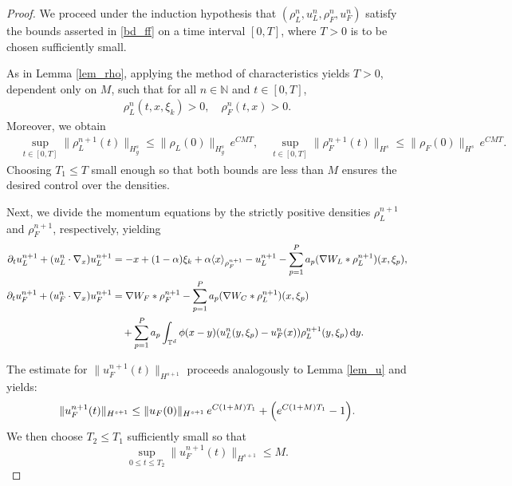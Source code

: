\documentclass[10pt, reqno]{amsart}
\theoremstyle{definition}
\theoremstyle{remark}
\numberwithin{equation}{section}
\newcommand{\dy}{\textnormal{d}y}
\newcommand{\T}{\mathbb{T}}
\newcommand{\p}{\partial}
\begin{document}
\begin{proof}
We proceed under the induction hypothesis that $(\rho_L^n, u_L^n, \rho_F^n, u_F^n)$ satisfy the bounds asserted in \eqref{bd_ff} on a time interval $[0, T]$, where $T > 0$ is to be chosen sufficiently small.

As in Lemma \ref{lem_rho}, applying the method of characteristics yields $T > 0$, dependent only on $M$, such that for all $n \in \mathbb{N}$ and $t \in [0, T]$,
    \begin{align*}
       \rho_L^{n}(t,x,\xi_k) > 0, \quad \rho_F^n (t,x) > 0.
    \end{align*}
    Moreover, we obtain 
\begin{align*}
    &\sup_{t\in [0,T]}  \|\rho_L^{n+1}(t)\|_{H^s_g} \le \|\rho_L(0)\|_{H^s_g}\, e^{CMT}, \quad \sup_{t\in [0,T]} \|\rho_F^{n+1}(t)\|_{H^s} \le \|\rho_F(0)\|_{H^s}\, e^{CMT}.
\end{align*}
Choosing $T_1 \leq T$ small enough so that both bounds are less than $M$ ensures the desired control over the densities.
 
Next, we divide the momentum equations by the strictly positive densities $\rho_L^{n+1}$ and $\rho_F^{n+1}$, respectively, yielding
    \begin{equation*}%
    \begin{split}
        \p_t u_L^{n+1} + (u_L^n\cdot \nabla_x) u_L^{n+1} &= -x + (1-\alpha) \xi_k + \alpha \langle x \rangle_{\rho_F^{n+1}}  - u_L^{n+1} - \sum_{p=1}^P a_p (\nabla W_L * \rho_L^{n+1})(x,\xi_p),\\
        \p_t u_F^{n+1} + (u_F^n\cdot \nabla_x)u_F^{n+1} &= \nabla W_F * \rho_F^{n+1} - \sum_{p=1}^P a_p (\nabla W_C * \rho_L^{n+1})(x,\xi_p) \\
        &\quad + \sum_{p=1}^P a_p \int_{\T^d} \phi(x-y) (u_L^n(y,\xi_p) - u_F^n(x)) \rho_L^{n+1}(y,\xi_p)\,\dy.
    \end{split}
    \end{equation*}
    
The estimate for $\|u_F^{n+1}(t)\|_{H^{s+1}}$ proceeds analogously to Lemma \ref{lem_u} and yields:
\[
\|u_F^{n+1}(t)\|_{H^{s+1}} \le \|u_F(0)\|_{H^{s+1}}\, e^{C(1+M)T_1} + \Bigl(e^{C(1+M)T_1}-1\Bigr).
\]
We then choose $T_2 \leq T_1$ sufficiently small so that
\[
\sup_{0\le t\le T_2} \|u_F^{n+1}(t)\|_{H^{s+1}}\le M.
\]


\end{proof}
\end{document}
